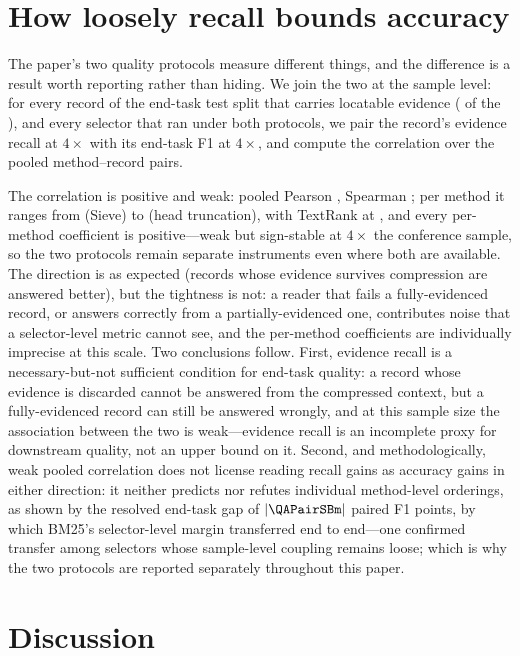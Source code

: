 \documentclass[pdflatex,sn-basic]{sn-jnl}
\DeclarePairedDelimiter\abs{\lvert}{\rvert}
\theoremstyle{remark}
\newcommand{\method}{Sieve}
\begin{document}
\section{How loosely recall bounds accuracy}
\label{sec:corr}
The paper's two quality protocols measure different things, and the
difference is a result worth reporting rather than hiding. We join the
two at the sample level: for every record of the end-task test split
that carries locatable evidence (\CorrNRecs{} of the \QAN{}), and every
selector that ran under both protocols, we pair the record's evidence
recall at $4\times$ with its end-task F1 at $4\times$, and compute
the correlation over the pooled \CorrNPairs{} method--record pairs.

The correlation is positive and weak: pooled Pearson
\CorrPearson{}, Spearman \CorrSpearman{}; per method it ranges from
\CorrSiePearson{} (\method{}) to \CorrHeaPearson{} (head truncation),
with TextRank at \CorrTRPearson{}, and every per-method coefficient
is positive---weak but sign-stable at $4\times$ the conference
sample, so the two protocols remain separate instruments even where
both are available.
The direction is as expected (records whose evidence survives
compression are answered better), but the tightness is not: a
reader that fails a fully-evidenced record, or answers correctly from
a partially-evidenced one, contributes noise that a selector-level
metric cannot see, and the per-method coefficients are individually
imprecise at this scale.
Two conclusions follow. First, evidence recall is a necessary-but-not
sufficient condition for end-task quality: a record whose evidence is
discarded cannot be answered from the compressed context, but a
fully-evidenced record can still be answered wrongly, and at this
sample size the association between the two is weak---evidence recall
is an incomplete proxy for downstream quality, not an upper bound on
it. Second, and methodologically,
weak pooled correlation does not license reading recall gains as
accuracy gains in either direction: it neither predicts nor refutes
individual method-level orderings, as shown by the resolved end-task
gap of $\abs{\QAPairSBm}$ paired F1 points, by which BM25's
selector-level margin transferred end to end---one
confirmed transfer among selectors whose sample-level coupling remains
loose; which is why the two protocols are reported separately
throughout this paper.

\section{Discussion}
\label{sec:discussion}
\end{document}
